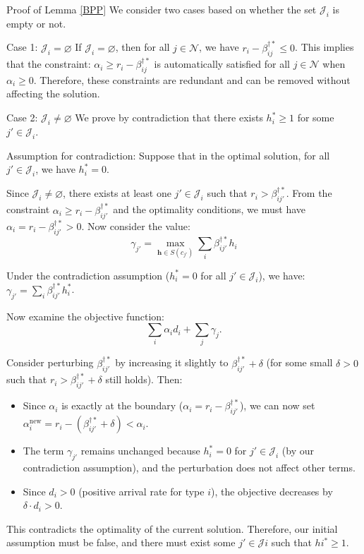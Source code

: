 \begin{pf}{Proof of Lemma \ref{BPP}}
We consider two cases based on whether the set $\mathcal{J}_{i}$ is empty or not.

Case 1: $\mathcal{J}_{i} = \varnothing$
If $\mathcal{J}_{i} = \varnothing$, then for all $j \in \mathcal{N}$, we have $r_i - \beta_{ij}^{\dag *} \leq 0$. This implies that the constraint: $\alpha_{i} \geq r_i - \beta_{ij}^{\dag *}$ is automatically satisfied for all $j \in \mathcal{N}$ when $\alpha_i \geq 0$. Therefore, these constraints are redundant and can be removed without affecting the solution.

Case 2: $\mathcal{J}_{i} \neq \varnothing$
We prove by contradiction that there exists $h_{i}^{*} \geq 1$ for some $j' \in \mathcal{J}_{i}$.

Assumption for contradiction: Suppose that in the optimal solution, for all $j' \in \mathcal{J}_{i}$, we have $h_{i}^{*} = 0$.

Since $\mathcal{J}_{i} \neq \varnothing$, there exists at least one $j' \in \mathcal{J}_{i}$ such that $r_{i} > \beta_{ij{'}}^{\dag *}$. From the constraint $\alpha_{i} \geq r_{i} - \beta_{ij{'}}^{\dag *}$ and the optimality conditions, we must have $\alpha_{i} = r_{i} - \beta_{ij{'}}^{\dag *} >0$. Now consider the value:
$$\gamma_{{j}{'}} = \max_{\bm{h} \in S(c_{j{'}})} \sum_{i} \beta_{ij{'}}^{\dag *} h_{i}$$

Under the contradiction assumption ($h_{i}^{*} = 0$ for all $j' \in \mathcal{J}_{i}$), we have:
$\gamma_{{j}{'}} = \sum_{i} \beta_{ij{'}}^{\dag *} h_{i}^{*}$.

Now examine the objective function: $$\sum_{i} \alpha_{i} d_{i} + \sum_{j} \gamma_{j}.$$

Consider perturbing $\beta_{ij'}^{\dag *}$ by increasing it slightly to $\beta_{ij'}^{\dag *} + \delta$ (for some small $\delta > 0$ such that $r_{i} > \beta_{ij'}^{\dag *} + \delta$ still holds). Then:

\begin{itemize}
  \item Since $\alpha_{i}$ is exactly at the boundary ($\alpha_{i} = r_{i} - \beta_{ij'}^{\dag *}$), we can now set $\alpha_{i}^{\text{new}} = r_{i} - (\beta_{ij'}^{\dag *} + \delta) < \alpha_{i}$.
  \item The term $\gamma_{j{'}}$ remains unchanged because $h_{i}^{*} = 0$ for $j' \in \mathcal{J}_{i}$ (by our contradiction assumption), and the perturbation does not affect other terms.
  \item Since $d_{i} > 0$ (positive arrival rate for type $i$), the objective decreases by $\delta \cdot d_{i} > 0$.
\end{itemize}

This contradicts the optimality of the current solution. Therefore, our initial assumption must be false, and there must exist some $j' \in \mathcal{J}{i}$ such that $h{i}^{*} \geq 1$.
\end{pf}


